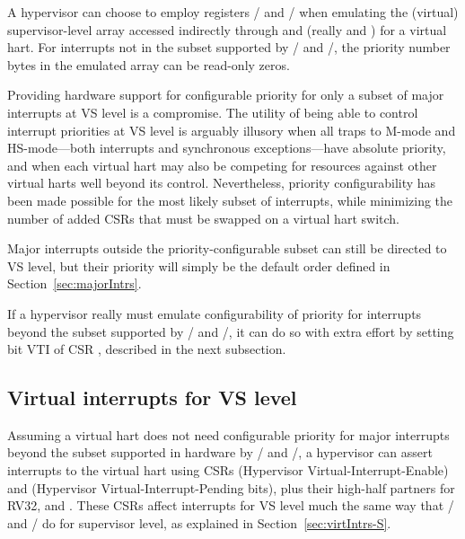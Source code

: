A hypervisor can choose to employ registers /
and / when emulating the (virtual)
supervisor-level  array accessed indirectly through
 and  (really  and ) for a
virtual hart.
For interrupts not in the subset supported by
/ and /, the priority
number bytes in the emulated  array can be read-only zeros.

\begin{commentary}
Providing hardware support for configurable priority for only a subset
of major interrupts at VS level is a compromise.
The utility of being able to control interrupt priorities at
VS level is arguably illusory when all traps to \mbox{M-mode} and
\mbox{HS-mode}---both interrupts and synchronous exceptions---have
absolute priority, and when each virtual hart may also be competing for
resources against other virtual harts well beyond its control.
Nevertheless, priority configurability has been made possible for the
most likely subset of interrupts, while minimizing the number of added
CSRs that must be swapped on a virtual hart switch.

Major interrupts outside the priority-configurable subset can still
be directed to VS level, but their priority will simply be the default
order defined in Section~\ref{sec:majorIntrs}.
\end{commentary}

If a hypervisor really must emulate configurability of priority for
interrupts beyond the subset supported by /
and /, it can do so with extra effort
by setting bit VTI of CSR , described in the next
subsection.

\subsection{Virtual interrupts for VS level}

Assuming a virtual hart does not need configurable priority for
major interrupts beyond the subset supported in hardware by
/ and /, a hypervisor
can assert interrupts to the virtual hart using CSRs 
(Hypervisor Virtual-Interrupt-Enable) and  (Hypervisor
Virtual-Interrupt-Pending bits), plus their high-half partners for RV32,
 and .
These CSRs affect interrupts for VS level much the same way that
/ and / do for supervisor level, as
explained in Section~\ref{sec:virtIntrs-S}.

